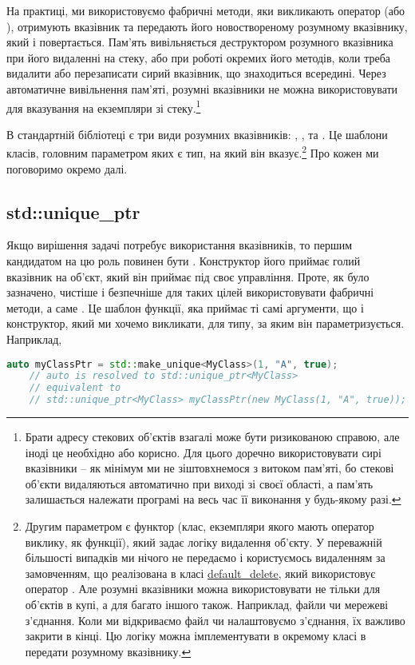 \documentclass[12pt]{article}
\begin{document}
    На практиці, ми використовуємо фабричні методи, яки викликають оператор  (або ), отримують вказівник та передають його новоствореному розумному вказівнику, який і повертається. Пам'ять вивільняється деструктором розумного вказівника при його видаленні на стеку, або при роботі окремих його методів, коли треба видалити або перезаписати сирий вказівник, що знаходиться всередині. Через автоматичне вивільнення пам'яті, розумні вказівники не можна використовувати для вказування на екземпляри зі стеку.\footnote{Брати адресу стекових об'єктів взагалі може бути ризикованою справою, але іноді це необхідно або корисно. Для цього доречно використовувати сирі вказівники -- як мінімум ми не зіштовхнемося з витоком пам'яті, бо стекові об'єкти видаляються автоматично при виході зі своєї області, а пам'ять залишається належати програмі на весь час її виконання у будь-якому разі.}

    В стандартній бібліотеці є три види розумних вказівників: , , та . Це шаблони класів, головним параметром яких є тип, на який він вказує.\footnote{Другим параметром є функтор (клас, екземпляри якого мають оператор виклику, як функції), який задає логіку видалення об'єкту. У переважній більшості випадків ми нічого не передаємо і користуємось видаленням за замовченням, що реалізована в класі \href{https://en.cppreference.com/w/cpp/memory/default_delete}{default\_delete}, який використовує оператор . Але розумні вказівники можна використовувати не тільки для об'єктів в купі, а для багато іншого також. Наприклад, файли чи мережеві з'єднання. Коли ми відкриваємо файл чи налаштовуємо з'єднання, їх важливо закрити в кінці. Цю логіку можна імплементувати в окремому класі в передати розумному вказівнику.} Про кожен ми поговоримо окремо далі.

    \subsection{std::unique\_ptr}
    Якщо вирішення задачі потребує використання вказівників, то першим кандидатом на цю роль повинен бути \href{https://en.cppreference.com/w/cpp/memory/unique_ptr}{}. Конструктор його приймає голий вказівник на об'єкт, який він приймає під своє управління. Проте, як було зазначено, чистіше і безпечніше для таких цілей використовувати фабричні методи, а саме \href{https://en.cppreference.com/w/cpp/memory/unique_ptr/make_unique}{}. Це шаблон функції, яка приймає ті самі аргументи, що і конструктор, який ми хочемо викликати, для типу, за яким він параметризується. Наприклад,
    \begin{lstlisting}[language=c++]
    auto myClassPtr = std::make_unique<MyClass>(1, "A", true);
    // auto is resolved to std::unique_ptr<MyClass>
    // equivalent to 
    // std::unique_ptr<MyClass> myClassPtr(new MyClass(1, "A", true));
    \end{lstlisting}
\end{document}

